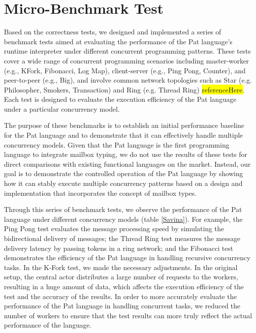 \documentclass{l4proj}
\begin{document}
\section{Micro-Benchmark Test}

Based on the correctness tests, we designed and implemented a series of benchmark tests aimed at evaluating the performance of the Pat language's runtime interpreter under different concurrent programming patterns. These tests cover a wide range of concurrent programming scenarios including master-worker (e.g., KFork, Fibonacci, Log Map), client-server (e.g., Ping Pong, Counter), and peer-to-peer (e.g., Big), and involve common network topologies such as Star (e.g. Philosopher, Smokers, Transaction) and Ring (e.g. Thread Ring) \colorbox{yellow}{referenceHere}. Each test is designed to evaluate the execution efficiency of the Pat language under a particular concurrency model.

The purpose of these benchmarks is to establish an initial performance baseline for the Pat language and to demonstrate that it can effectively handle multiple concurrency models. Given that the Pat language is the first programming language to integrate mailbox typing, we do not use the results of these tests for direct comparisons with existing functional languages on the market. Instead, our goal is to demonstrate the controlled operation of the Pat language by showing how it can stably execute multiple concurrency patterns based on a design and implementation that incorporates the concept of mailbox types.

Through this series of benchmark tests, we observe the performance of the Pat language under different concurrency models (table \ref{Savina}). For example, the Ping Pong test evaluates the message processing speed by simulating the bidirectional delivery of messages; the Thread Ring test measures the message delivery latency by passing tokens in a ring network; and the Fibonacci test demonstrates the efficiency of the Pat language in handling recursive concurrency tasks. In the K-Fork test, we made the necessary adjustments. In the original setup, the central actor distributes a large number of requests to the workers, resulting in a huge amount of data, which affects the execution efficiency of the test and the accuracy of the results. In order to more accurately evaluate the performance of the Pat language in handling concurrent tasks, we reduced the number of workers to ensure that the test results can more truly reflect the actual performance of the language.
\end{document}
